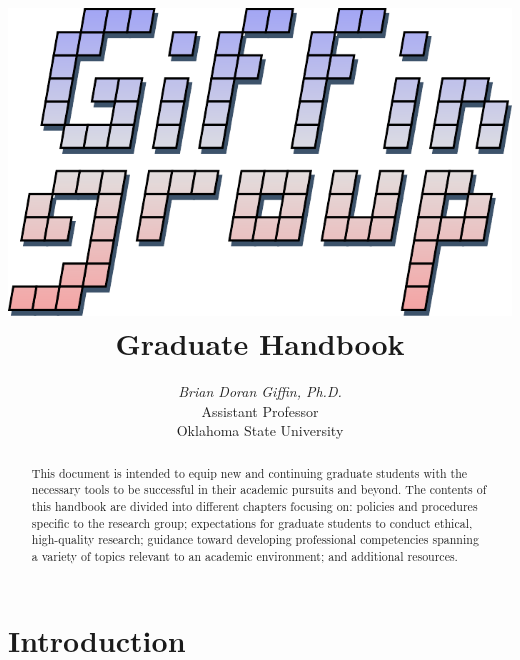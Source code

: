 \documentclass[12pt,a4paper,article,oneside]{memoir} %
\begin{document}

\title{\includegraphics[]{giffin_group_logo} \\ Graduate Handbook}
\author{\textit{Brian Doran Giffin, Ph.D.} \\ Assistant Professor \\ Oklahoma State University}
\maketitle

\begin{abstract}
This document is intended to equip new and continuing graduate students with the necessary tools to be successful in their academic pursuits and beyond.
The contents of this handbook are divided into different chapters focusing on: policies and procedures specific to the research group; expectations for graduate students to conduct ethical, high-quality research; guidance toward developing professional competencies spanning a variety of topics relevant to an academic environment; and additional resources.
\end{abstract}


\newpage

\tableofcontents* %

\newpage%

\newpage

\chapter{Introduction}
\end{document}
